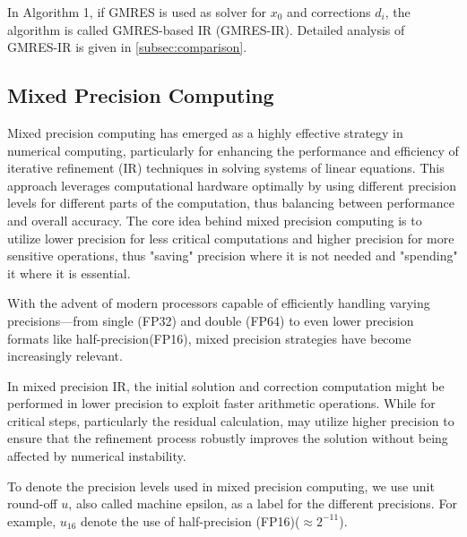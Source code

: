 In Algorithm 1, if GMRES is used as solver for $x_0$ and corrections $d_i$, the algorithm is called GMRES-based IR (GMRES-IR). Detailed analysis of GMRES-IR is given in \ref{subsec:comparison}.

\subsection{Mixed Precision Computing}
Mixed precision computing has emerged as a highly effective strategy in numerical computing, 
particularly for enhancing the performance and efficiency of iterative refinement (IR) techniques in solving systems of linear equations. 
This approach leverages computational hardware optimally by using different precision levels for different parts of the computation, 
thus balancing between performance and overall accuracy.
The core idea behind mixed precision computing is to utilize lower precision for less critical computations and higher precision for more sensitive operations, 
thus "saving" precision where it is not needed and "spending" it where it is essential.

With the advent of modern processors capable of efficiently handling varying precisions—from single (FP32) and double (FP64) to even lower precision formats like half-precision(FP16), 
mixed precision strategies have become increasingly relevant. 

In mixed precision IR, the initial solution and correction computation might be performed in lower precision to exploit faster arithmetic operations. 
While for critical steps, particularly the residual calculation, may utilize higher precision to ensure that the refinement process robustly improves the solution without being affected by numerical instability.

To denote the precision levels used in mixed precision computing, 
we use unit round-off $u$, also called machine epsilon, as a label for the different precisions. 
For example, $u_{16}$ denote the use of half-precision (FP16)($\approx 2^{-11}$).
\clearpage